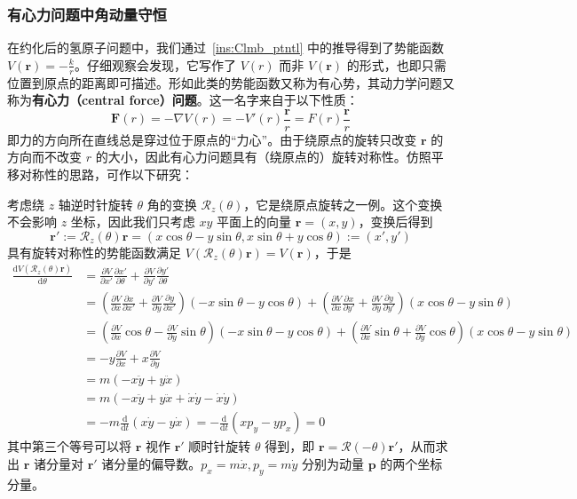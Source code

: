 \documentclass[cn,10pt,math=newtx,citestyle=gb7714-2015,bibstyle=gb7714-2015]{elegantbook}
\def\bm{\boldsymbol}
\def\mc{\mathcal}
\def\d{\mathrm d}
\def\p{\partial}
\begin{document}
\subsubsection{有心力问题中角动量守恒}
在约化后的氢原子问题中，我们通过~\ref{ins:Clmb_ptntl} 中的推导得到了势能函数 $V(\bm r)=-\frac{k}{r}$。仔细观察会发现，它写作了 $V(r)$ 而非 $V(\bm r)$ 的形式，也即只需位置到原点的距离即可描述。形如此类的势能函数又称为有心势，其动力学问题又称为\textbf{有心力（central force）问题}。这一名字来自于以下性质：
\begin{equation*}
    \bm F(r)=-\nabla V(r)=-V'(r)\frac{\bm r}{r}=F(r)\frac{\bm r}{r}
\end{equation*}
即力的方向所在直线总是穿过位于原点的“力心”。由于绕原点的旋转只改变 $\bm r$ 的方向而不改变 $r$ 的大小，因此有心力问题具有（绕原点的）旋转对称性。仿照平移对称性的思路，可作以下研究：

考虑绕 $z$ 轴逆时针旋转 $\theta$ 角的变换 $\mc R_z(\theta)$，它是绕原点旋转之一例。这个变换不会影响 $z$ 坐标，因此我们只考虑 $xy$ 平面上的向量 $\bm r=(x,y)$，变换后得到
\begin{equation*}
    \bm r':=\mc R_z(\theta)\bm r=(x\cos\theta-y\sin\theta, x\sin\theta+y\cos\theta):=(x',y')
\end{equation*}
具有旋转对称性的势能函数满足 $V(\mc R_z(\theta)\bm r)=V(\bm r)$，于是
\begin{align*}
    \frac{\d V(\mc R_z(\theta)\bm r)}{\d\theta} &= \frac{\p V}{\p x'}\frac{\p x'}{\p\theta}+\frac{\p V}{\p y'}\frac{\p y'}{\p\theta} \\
    &= \left(\frac{\p V}{\p x}\frac{\p x}{\p x'}+\frac{\p V}{\p y}\frac{\p y}{\p x'}\right)(-x\sin\theta-y\cos\theta)+\left(\frac{\p V}{\p x}\frac{\p x}{\p y'}+\frac{\p V}{\p y}\frac{\p y}{\p y'}\right)(x\cos\theta-y\sin\theta) \\
    &= \left(\frac{\p V}{\p x}\cos\theta-\frac{\p V}{\p y}\sin\theta\right)(-x\sin\theta-y\cos\theta)+\left(\frac{\p V}{\p x}\sin\theta+\frac{\p V}{\p y}\cos\theta\right)(x\cos\theta-y\sin\theta) \\
    & = -y\frac{\p V}{\p x}+x\frac{\p V}{\p y}\\
    & = m(-x\ddot{y}+y\ddot{x})\\
    & = m(-x\ddot{y}+y\ddot{x}+\dot{x}\dot{y}-\dot{x}\dot{y})\\
    & = -m\frac{\d}{\d t}(x\dot y-y\dot x)=-\frac{\d}{\d t}(xp_y-yp_x)=0
\end{align*}
其中第三个等号可以将 $\bm r$ 视作 $\bm r'$ 顺时针旋转 $\theta$ 得到，即 $\bm r=\mc R(-\theta)\bm r'$，从而求出 $\bm r$ 诸分量对 $\bm r'$ 诸分量的偏导数。$p_x=m\dot{x},p_y=m\dot{y}$ 分别为动量 $\bm p$ 的两个坐标分量。
\end{document}
